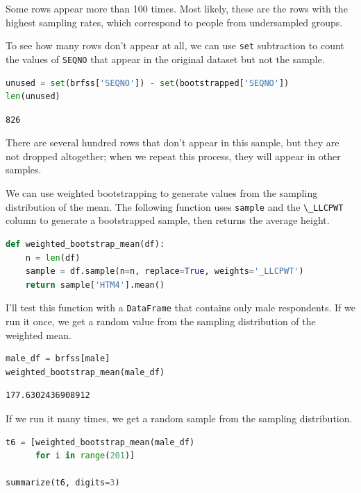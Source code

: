 Some rows appear more than 100 times. Most likely, these are the rows
with the highest sampling rates, which correspond to people from
undersampled groups.

To see how many rows don't appear at all, we can use
\passthrough{\lstinline!set!} subtraction to count the values of
\passthrough{\lstinline!SEQNO!} that appear in the original dataset but
not the sample.

\begin{lstlisting}[language=Python]
unused = set(brfss['SEQNO']) - set(bootstrapped['SEQNO'])
len(unused)
\end{lstlisting}

\begin{lstlisting}[]
826
\end{lstlisting}

There are several hundred rows that don't appear in this sample, but
they are not dropped altogether; when we repeat this process, they will
appear in other samples.

We can use weighted bootstrapping to generate values from the sampling
distribution of the mean. The following function uses
\passthrough{\lstinline!sample!} and the
\passthrough{\lstinline!\_LLCPWT!} column to generate a bootstrapped
sample, then returns the average height.

\begin{lstlisting}[language=Python]
def weighted_bootstrap_mean(df):
    n = len(df)
    sample = df.sample(n=n, replace=True, weights='_LLCPWT')
    return sample['HTM4'].mean()
\end{lstlisting}

I'll test this function with a \passthrough{\lstinline!DataFrame!} that
contains only male respondents. If we run it once, we get a random value
from the sampling distribution of the weighted mean.

\begin{lstlisting}[language=Python]
male_df = brfss[male]
weighted_bootstrap_mean(male_df)
\end{lstlisting}

\begin{lstlisting}[]
177.6302436908912
\end{lstlisting}

If we run it many times, we get a random sample from the sampling
distribution.

\begin{lstlisting}[language=Python]
t6 = [weighted_bootstrap_mean(male_df) 
      for i in range(201)]

summarize(t6, digits=3)
\end{lstlisting}

